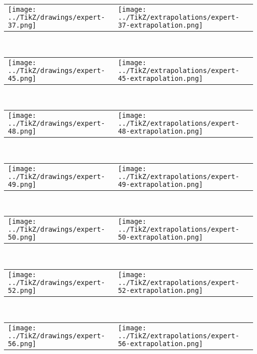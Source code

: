             \begin{tabular}{ll}
    \texttt{[image: ../TikZ/drawings/expert-37.png]}&
    \texttt{[image: ../TikZ/extrapolations/expert-37-extrapolation.png]}
    \end{tabular}        
            \\

            \begin{tabular}{ll}
    \texttt{[image: ../TikZ/drawings/expert-45.png]}&
    \texttt{[image: ../TikZ/extrapolations/expert-45-extrapolation.png]}
    \end{tabular}        
            \\

            \begin{tabular}{ll}
    \texttt{[image: ../TikZ/drawings/expert-48.png]}&
    \texttt{[image: ../TikZ/extrapolations/expert-48-extrapolation.png]}
    \end{tabular}        
            \\

            \begin{tabular}{ll}
    \texttt{[image: ../TikZ/drawings/expert-49.png]}&
    \texttt{[image: ../TikZ/extrapolations/expert-49-extrapolation.png]}
    \end{tabular}        
            \\

            \begin{tabular}{ll}
    \texttt{[image: ../TikZ/drawings/expert-50.png]}&
    \texttt{[image: ../TikZ/extrapolations/expert-50-extrapolation.png]}
    \end{tabular}        
            \\

            \begin{tabular}{ll}
    \texttt{[image: ../TikZ/drawings/expert-52.png]}&
    \texttt{[image: ../TikZ/extrapolations/expert-52-extrapolation.png]}
    \end{tabular}        
            \\

            \begin{tabular}{ll}
    \texttt{[image: ../TikZ/drawings/expert-56.png]}&
    \texttt{[image: ../TikZ/extrapolations/expert-56-extrapolation.png]}
    \end{tabular}        
            \\

